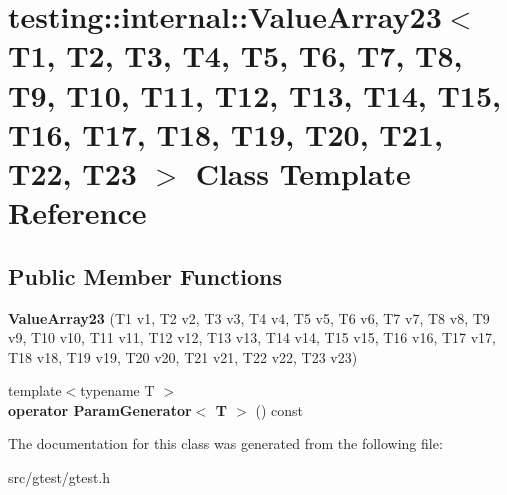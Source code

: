 \hypertarget{classtesting_1_1internal_1_1_value_array23}{}\section{testing\+:\+:internal\+:\+:Value\+Array23$<$ T1, T2, T3, T4, T5, T6, T7, T8, T9, T10, T11, T12, T13, T14, T15, T16, T17, T18, T19, T20, T21, T22, T23 $>$ Class Template Reference}
\label{classtesting_1_1internal_1_1_value_array23}
\subsection*{Public Member Functions}
\begin{DoxyCompactItemize}
\item 
\mbox{\label{classtesting_1_1internal_1_1_value_array23_a39a294eac1033599b11fde99d8c211ac}} 
{\bfseries Value\+Array23} (T1 v1, T2 v2, T3 v3, T4 v4, T5 v5, T6 v6, T7 v7, T8 v8, T9 v9, T10 v10, T11 v11, T12 v12, T13 v13, T14 v14, T15 v15, T16 v16, T17 v17, T18 v18, T19 v19, T20 v20, T21 v21, T22 v22, T23 v23)
\item 
\mbox{\label{classtesting_1_1internal_1_1_value_array23_a667a3e2676bba0d87007e2b1425431c6}} 
{\footnotesize template$<$typename T $>$ }\\{\bfseries operator Param\+Generator$<$ T $>$} () const
\end{DoxyCompactItemize}


The documentation for this class was generated from the following file\+:\begin{DoxyCompactItemize}
\item 
src/gtest/gtest.\+h\end{DoxyCompactItemize}
